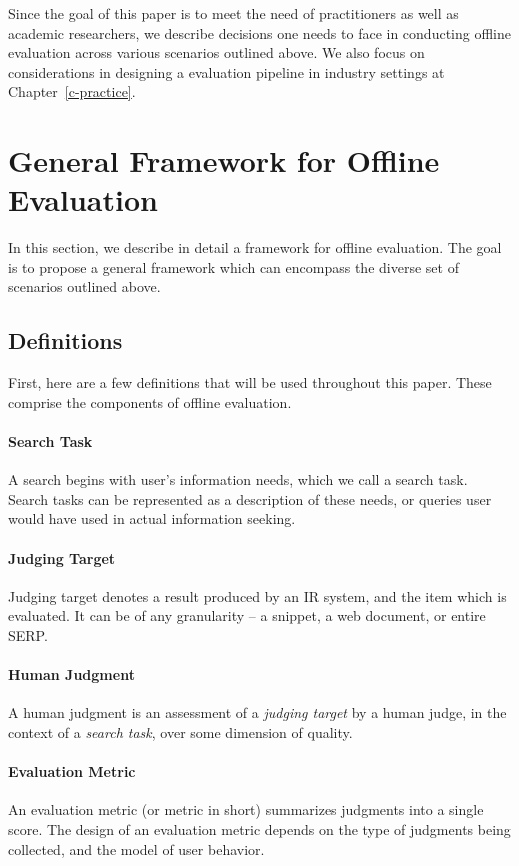 Since the goal of this paper is to meet the need of practitioners as well as academic researchers, we describe decisions one needs to face in conducting offline evaluation across various scenarios outlined above. We also focus on considerations in designing a evaluation pipeline in industry settings at Chapter~\ref{c-practice}.

\section{General Framework for Offline Evaluation}

In this section, we describe in detail a framework for offline evaluation. The goal is to propose a general framework which can encompass the diverse set of scenarios outlined above. 

\subsection{Definitions}

First, here are a few definitions that will be used throughout this paper. These comprise the components of offline evaluation.

\paragraph{Search Task} A search begins with user's information needs, which we call a search task. Search tasks can be represented as a description of these needs, or queries user would have used in actual information seeking.

\paragraph{Judging Target} Judging target denotes a result produced by an IR system, and the item which is evaluated. It can be of any granularity -- a snippet, a web document, or entire SERP. 

\paragraph{Human Judgment} A human judgment is an assessment of a \textit{judging target} by a human judge, in the context of a \textit{search task}, over some dimension of quality. 

\paragraph{Evaluation Metric} An evaluation metric (or metric in short) summarizes judgments into a single score. The design of an evaluation metric depends on the type of judgments being collected, and the model of user behavior.

